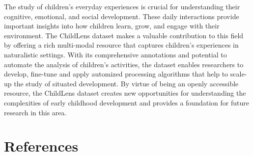 \documentclass[
  man,floatsintext]{apa6}
\begin{document}
The study of children's everyday experiences is crucial for understanding their cognitive, emotional, and social development. These daily interactions provide important insights into how children learn, grow, and engage with their environment. The ChildLens dataset makes a valuable contribution to this field by offering a rich multi-modal resource that captures children's experiences in naturalistic settings. With its comprehensive annotations and potential to automate the analysis of children's activities, the dataset enables researchers to develop, fine-tune and apply automized processing algorithms that help to scale-up the study of situated development. By virtue of being an openly accessible resource, the ChildLens dataset creates new opportunities for understanding the complexities of early childhood development and provides a foundation for future research in this area.

\newpage

\section{References}\label{references}

\begingroup
\setlength{\parindent}{-0.5in}
\setlength{\leftskip}{0.5in}
\end{document}
